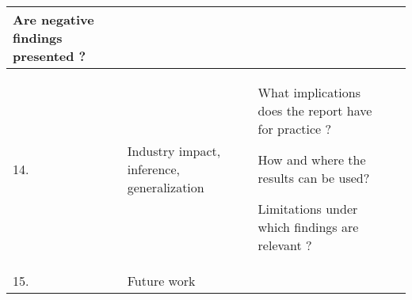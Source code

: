 {\begin{tabular}{|>{\raggedright}p{}|>{\raggedright}p{}|>{\raggedright}p{}|>{\raggedright}p{}|}
Are negative findings presented \citep{Kitchenham2007}? & \tabularnewline
\hline 
14. & Industry impact, inference, generalization & What implications does the report have for practice \citep{Kitchenham2007}?

How and where the results can be used?

Limitations under which findings are relevant \citep{Jedlitschka2005}? & \tabularnewline
\hline 
15. & Future work &  & \tabularnewline
\hline

\end{tabular}
} %
